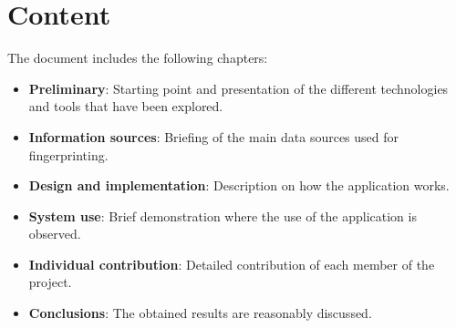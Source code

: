 \section{Content}
The document includes the following chapters:
\begin{itemize}
    \item \textbf{Preliminary}: Starting point and presentation of the different technologies and tools that have been explored.
    \item \textbf{Information sources}: Briefing of the main data sources used for fingerprinting.
    \item \textbf{Design and implementation}: Description on how the application works.
    \item \textbf{System use}: Brief demonstration where the use of the application is observed.
    \item \textbf{Individual contribution}: Detailed contribution of each member of the project.
    \item \textbf{Conclusions}: The obtained results are reasonably discussed.
\end{itemize}
